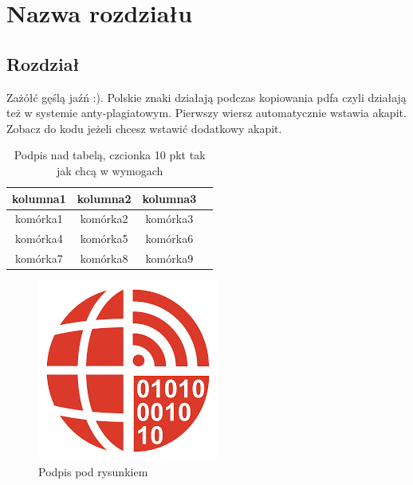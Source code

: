 \chapter{Nazwa rozdziału}

\section{Rozdział}
Zażółć gęślą jaźń :). Polskie znaki działają podczas kopiowania pdfa czyli działają też w systemie anty-plagiatowym. Pierwszy wiersz automatycznie wstawia akapit. \\ %
\indent Zobacz do kodu jeżeli chcesz wstawić dodatkowy akapit. \cite{goodfellow2016deep} %

\begin{table}[ht]                       %
\centering                              %
\caption{Podpis nad tabelą,             %
         czcionka 10 pkt                %
         tak jak chcą w wymogach }      %
\begin{tabular}[t]{|c|c|c|c|}           %
\hline                                  %
kolumna1 & kolumna2 & kolumna3 \\       %
\hline                                  %
komórka1 & komórka2 & komórka3 \\       %
komórka4 & komórka5 & komórka6 \\       %
komórka7 & komórka8 & komórka9 \\       %
\hline                                  %
\end{tabular}                           %
\label{tab:caption}                     %
\end{table}                             %

\lipsum[2]   %

\begin{figure}[h!]{}                            %
    \centering                                  %
    \includegraphics[scale=0.4]{pobrane.png}    %
    \caption{Podpis pod rysunkiem}              %
    \label{fig:logo}                            %
\end{figure}                                    %


